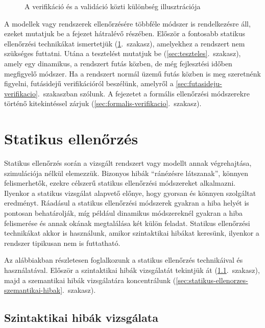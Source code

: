 \begin{figure}[h]
	\centering
	
	
	\caption{A verifikáció és a validáció közti különbség illusztrációja}
	\label{fig:verifikacio_vs_validacio}
\end{figure}

A modellek vagy rendszerek ellenőrzésére többféle módszer is rendelkezésre áll, ezeket mutatjuk be a fejezet hátralévő részében. Először a fontosabb statikus ellenőrzési technikákat ismertetjük (\ref{sec:statikus-ellenorzes}.~szakasz), amelyekhez a rendszert nem szükséges futtatni. Utána a tesztelést mutatjuk be (\ref{sec:teszteles}.~szakasz), amely egy dinamikus, a rendszert futás közben, de még fejlesztési időben megfigyelő módszer. Ha a rendszert normál üzemű futás közben is meg szeretnénk figyelni, futásidejű verifikációról beszélünk, amelyről a \ref{sec:futasideju-verifikacio}.~szakaszban szólunk. A fejezetet a formális ellenőrzési módszerekre történő kitekintéssel zárjuk (\ref{sec:formalis-verifikacio}.~szakasz).



\section{Statikus ellenőrzés}\label{sec:statikus-ellenorzes}
Statikus ellenőrzés során a vizsgált rendszert vagy modellt annak végrehajtása, szimulációja nélkül elemezzük. Bizonyos hibák ``ránézésre látszanak'', könnyen felismerhetők, ezekre célszerű statikus ellenőrzési módszereket alkalmazni. Ilyenkor a statikus vizsgálat alapvető előnye, hogy gyorsan és könnyen szolgáltat eredményt. Ráadásul a statikus ellenőrzési módszerek gyakran a hiba helyét is pontosan behatárolják, míg például dinamikus módszereknél gyakran a hiba felismerése és annak okának megtalálása két külön feladat. Statikus ellenőrzési technikákat akkor is használunk, amikor szintaktikai hibákat keresünk, ilyenkor a rendszer tipikusan nem is futtatható.

Az alábbiakban részletesen foglalkozunk a statikus ellenőrzés technikáival és használatával. Először a szintaktikai hibák vizsgálatát tekintjük át (\ref{sec:statikus-ellenorzes-szintaktikai-hibak}.~szakasz), majd a szemantikai hibák vizsgálatára koncentrálunk (\ref{sec:statikus-ellenorzes-szemantikai-hibak}.~szakasz). 

\subsection{Szintaktikai hibák vizsgálata}\label{sec:statikus-ellenorzes-szintaktikai-hibak}


